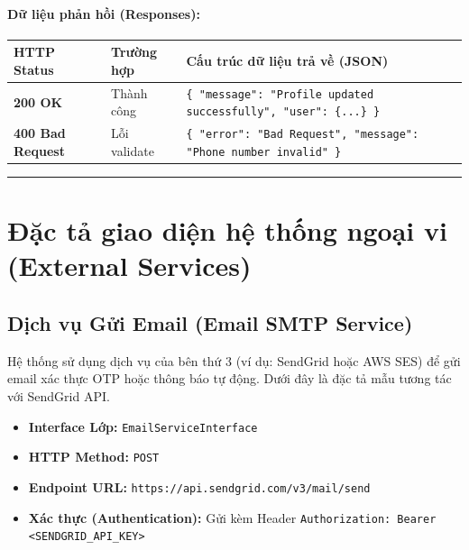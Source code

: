 \documentclass[12pt,a4paper]{article}
\begin{document}
\paragraph{Dữ liệu phản hồi (Responses):}
\begin{longtable}{|>{\raggedright\arraybackslash}p{2.8cm}|>{\raggedright\arraybackslash}p{3.2cm}|>{\raggedright\arraybackslash}p{8.0cm}|}
\hline
\textbf{HTTP Status} & \textbf{Trường hợp} & \textbf{Cấu trúc dữ liệu trả về (JSON)} \\ \hline
\endhead
\textbf{200 OK} & Thành công & \texttt{\{ "message": "Profile updated successfully", "user": \{...\} \}} \\ \hline
\textbf{400 Bad Request} & Lỗi validate & \texttt{\{ "error": "Bad Request", "message": "Phone number invalid" \}} \\ \hline
\end{longtable}

\vskip 0.4cm
\noindent\rule{\textwidth}{0.3pt}
\vskip 0.4cm

\newpage
\section{Đặc tả giao diện hệ thống ngoại vi (External Services)}

\subsection{Dịch vụ Gửi Email (Email SMTP Service)}
Hệ thống sử dụng dịch vụ của bên thứ 3 (ví dụ: SendGrid hoặc AWS SES) để gửi email xác thực OTP hoặc thông báo tự động. Dưới đây là đặc tả mẫu tương tác với SendGrid API.

\begin{itemize}[leftmargin=*]
    \item \textbf{Interface Lớp:} \texttt{EmailServiceInterface}
    \item \textbf{HTTP Method:} \texttt{POST}
    \item \textbf{Endpoint URL:} \texttt{https://api.sendgrid.com/v3/mail/send}
    \item \textbf{Xác thực (Authentication):} Gửi kèm Header \texttt{Authorization: Bearer \textless{}SENDGRID\_API\_KEY\textgreater{}}
\end{itemize}
\end{document}
